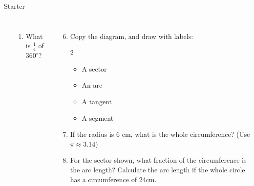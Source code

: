 \documentclass{beamer}
\newcommand{\ashow}[1]{\uncover<2->{\textcolor{red}{\small #1}}}
\begin{document}
\begin{frame}{Starter}
\begin{columns}
\begin{center}
\begin{tikzpicture}[scale=1]
\end{tikzpicture}

\end{center}


\small
\begin{enumerate}
  \item What is $\frac{1}{4}$ of $360^\circ$? \ashow{$90^\circ$}
\end{enumerate}

\begin{enumerate}
  \setcounter{enumi}{5}
  \item Copy the diagram, and draw with labels:
    \begin{multicols}{2}
    \begin{itemize}
      \item A sector
      \item An arc
      \item A tangent
      \item A segment
    \end{itemize}
    \end{multicols}
  \item If the radius is $6$ cm, what is the whole circumference? (Use $\pi \approx 3.14$) \ashow{$37.68$ cm}
  \item For the sector shown, what fraction of the circumference is the arc length? Calculate the arc length if the whole circle has a circumference of 24cm. \ashow{$\frac{1}{6}$; $4$ cm}

\end{enumerate}

\end{columns}
\end{frame}
\end{document}
